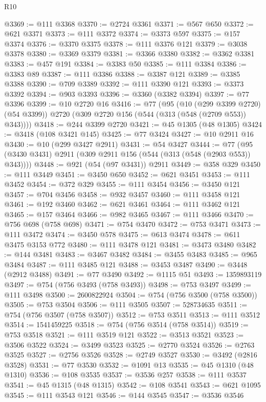 \begin{lexlean}{R10}
\begin{coremodule}
{{{{{{{{{{{{{{{{{{{{{{{{{{{{{{{{{{{{{{{{{{{{{{{{{{{{{{{{{{{{{{{{{{{{{{{{{{{{{{{{{{{{{{{{{{{{{{{{{{{{{{{{{{{{@3369 := @111 @3368
@3370 := @2724 @3361
@3371 := @567 @650
@3372 := @621 @3371
@3373 := @111 @3372
@3374 := @3373 @597
@3375 := @157 @3374
@3376 := @3370 @3375
@3378 := @111 @3376 @121
@3379 := @3038 @3378
@3380 := @3369 @3379
@3381 := @3366 @3380
@3382 := @3362 @3381
@3383 := @457 @191
@3384 := @3383 @50
@3385 := @111 @3384
@3386 := @3383 @89
@3387 := @111 @3386
@3388 := @3387 @121
@3389 := @3385 @3388
@3390 := @709 @3389
@3392 := @111 @3390 @121
@3393 := @3373 @3392
@3394 := @903 @3393
@3396 := @3360 (@3382 @3394)
@3397 := @77 @3396
@3399 := @10 @2720 @16
@3416 := @77
    (@95
      (@10 (@299 @3399 @2720) (@54 @3399))
      @2720
      (@309 @2720 @156 (@544 (@313 (@548 (@2709 @553)) @343))))
@3418 := @244 @3399 @2720
@3421 := @45 @1305 (@48 @1305)
@3424 := @3418 (@108 @3421 @145)
@3425 := @77 @3424
@3427 := @10 @2911 @16
@3430 := @10 (@299 @3427 @2911)
@3431 := @54 @3427
@3444 := @77 (@95 (@3430 @3431) @2911 (@309 @2911 @156 (@544 (@313 (@548 (@2903 @553)) @343))))
@3448 := @921 (@54 (@97 @3431)) @2911
@3449 := @358 @329
@3450 := @111 @3449
@3451 := @3450 @650
@3452 := @621 @3451
@3453 := @111 @3452
@3454 := @372 @329
@3455 := @111 @3454
@3456 := @3450 @121
@3457 := @704 @3456
@3458 := @932 @3457
@3460 := @111 @3458 @121
@3461 := @192 @3460
@3462 := @621 @3461
@3464 := @111 @3462 @121
@3465 := @157 @3464
@3466 := @982 @3465
@3467 := @111 @3466
@3470 := @756 @698 (@758 @698)
@3471 := @754 @3470
@3472 := @753 @3471
@3473 := @111 @3472
@3474 := @3450 @578
@3475 := @613 @3474
@3478 := @611 @3475 @3153 @772
@3480 := @111 @3478 @121
@3481 := @3473 @3480
@3482 := @144 @3481
@3483 := @3467 @3482
@3484 := @3455 @3483
@3485 := @965 @3484
@3487 := @111 @3485 @121
@3488 := @3453 @3487
@3490 := @3448 (@2912 @3488)
@3491 := @77 @3490
@3492 := @1115 @51
@3493 := 1359893119
@3497 := @754 (@756 @3493 (@758 @3493))
@3498 := @753 @3497
@3499 := @111 @3498
@3500 := 2600822924
@3504 := @754 (@756 @3500 (@758 @3500))
@3505 := @753 @3504
@3506 := @111 @3505
@3507 := 528734635
@3511 := @754 (@756 @3507 (@758 @3507))
@3512 := @753 @3511
@3513 := @111 @3512
@3514 := 1541459225
@3518 := @754 (@756 @3514 (@758 @3514))
@3519 := @753 @3518
@3521 := @111 @3519 @121
@3522 := @3513 @3521
@3523 := @3506 @3522
@3524 := @3499 @3523
@3525 := @2770 @3524
@3526 := @2763 @3525
@3527 := @2756 @3526
@3528 := @2749 @3527
@3530 := @3492 (@2816 @3528)
@3531 := @77 @3530
@3532 := @1091 @13
@3535 := @45 @1310 (@48 @1310)
@3536 := @108 @3535
@3537 := @3536 @257
@3538 := @111 @3537
@3541 := @45 @1315 (@48 @1315)
@3542 := @108 @3541
@3543 := @621 @1095
@3545 := @111 @3543 @121
@3546 := @144 @3545
@3547 := @3536 @3546
}}}}}}}}}}}}}}}}}}}}}}}}}}}}}}}}}}}}}}}}}}}}}}}}}}}}}}}}}}}}}}}}}}}}}}}}}}}}}}}}}}}}}}}}}}}}}}}}}}}}}}}}}}}}
\end{coremodule}
\end{lexlean}

